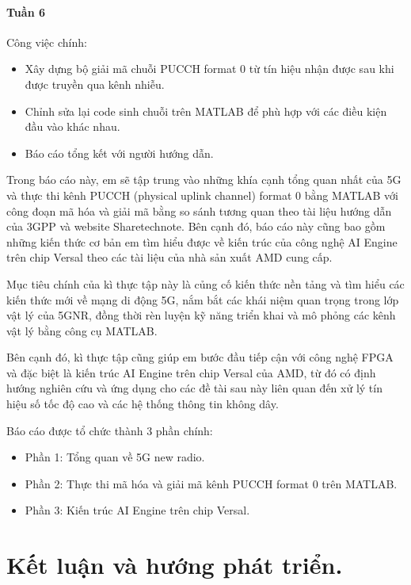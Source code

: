 \documentclass[13pt]{report}
\begin{document}
\subsubsection{Tuần 6}
Công việc chính:
\begin{itemize}
    \item Xây dựng bộ giải mã chuỗi PUCCH format 0 từ tín hiệu nhận được sau khi được truyền qua kênh nhiễu.
    \item Chỉnh sửa lại code sinh chuỗi trên MATLAB để phù hợp với các điều kiện đầu vào khác nhau.
    \item Báo cáo tổng kết với người hướng dẫn.
\end{itemize}


Trong báo cáo này, em sẽ tập trung vào những khía cạnh tổng quan nhất của 5G và thực thi kênh PUCCH (physical uplink channel) format 0 bằng MATLAB với công đoạn mã hóa và giải mã bằng so sánh tương quan theo tài liệu hướng dẫn của 3GPP và website Sharetechnote. 
Bên cạnh đó, báo cáo này cũng bao gồm những kiến thức cơ bản em tìm hiểu được về kiến trúc của công nghệ AI Engine trên chip Versal theo các tài liệu của nhà sản xuất AMD cung cấp.

Mục tiêu chính của kì thực tập này là củng cố kiến thức nền tảng và tìm hiểu các kiến thức mới về mạng di động 5G, nắm bắt các khái niệm quan trọng trong lớp vật lý của 5GNR, đồng thời rèn luyện kỹ năng triển khai và mô phỏng các kênh vật lý bằng công cụ MATLAB.  

Bên cạnh đó, kì thực tập cũng giúp em bước đầu tiếp cận với công nghệ FPGA và đặc biệt là kiến trúc AI Engine trên chip Versal của AMD, từ đó có định hướng nghiên cứu và ứng dụng cho các đề tài sau này liên quan đến xử lý tín hiệu số tốc độ cao và các hệ thống thông tin không dây.  

Báo cáo được tổ chức thành 3 phần chính:
\begin{itemize}
    \item Phần 1: Tổng quan về 5G new radio.
    \item Phần 2: Thực thi mã hóa và giải mã kênh PUCCH format 0 trên MATLAB.
    \item Phần 3: Kiến trúc AI Engine trên chip Versal. 
\end{itemize}


\newpage



\chapter{Kết luận và hướng phát triển.}
\end{document}
